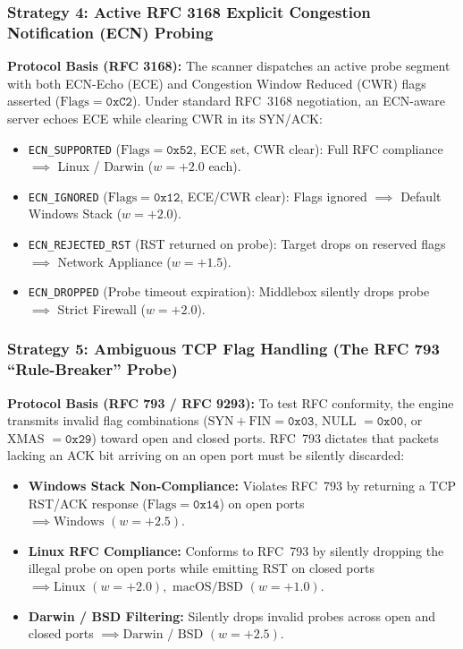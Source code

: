 \subsubsection{Strategy 4: Active RFC 3168 Explicit Congestion Notification (ECN) Probing}
\textbf{Protocol Basis (RFC 3168):} The scanner dispatches an active probe segment with both ECN-Echo (ECE)
and Congestion Window Reduced (CWR) flags asserted ($\text{Flags} = \mathtt{0xC2}$). Under standard RFC~3168
negotiation, an ECN-aware server echoes ECE while clearing CWR in its SYN/ACK:
\begin{itemize}
    \item \texttt{ECN\_SUPPORTED} ($\text{Flags} = \mathtt{0x52}$, ECE set, CWR clear): Full RFC compliance $\implies$ Linux / Darwin ($w = +2.0$ each).
    \item \texttt{ECN\_IGNORED} ($\text{Flags} = \mathtt{0x12}$, ECE/CWR clear): Flags ignored $\implies$ Default Windows Stack ($w = +2.0$).
    \item \texttt{ECN\_REJECTED\_RST} (RST returned on probe): Target drops on reserved flags $\implies$ Network Appliance ($w = +1.5$).
    \item \texttt{ECN\_DROPPED} (Probe timeout expiration): Middlebox silently drops probe $\implies$ Strict Firewall ($w = +2.0$).
\end{itemize}

\subsubsection{Strategy 5: Ambiguous TCP Flag Handling (The RFC 793 ``Rule-Breaker'' Probe) }
\textbf{Protocol Basis (RFC 793 / RFC 9293):} To test RFC conformity, the engine transmits invalid flag
combinations ($\text{SYN}+\text{FIN} = \mathtt{0x03}$, NULL $= \mathtt{0x00}$, or XMAS $= \mathtt{0x29}$)
toward open and closed ports. RFC~793 dictates that packets lacking an ACK bit arriving on an open port
must be silently discarded:
\begin{itemize}
    \item \textbf{Windows Stack Non-Compliance:} Violates RFC~793 by returning a TCP RST/ACK response
    ($\text{Flags} = \mathtt{0x14}$) on open ports $\implies \text{Windows } (w = +2.5)$.
    \item \textbf{Linux RFC Compliance:} Conforms to RFC~793 by silently dropping the illegal probe on open
    ports while emitting RST on closed ports $\implies \text{Linux } (w = +2.0), \text{ macOS/BSD } (w = +1.0)$.
    \item \textbf{Darwin / BSD Filtering:} Silently drops invalid probes across open and closed ports
    $\implies \text{Darwin / BSD } (w = +2.5)$.
\end{itemize}

